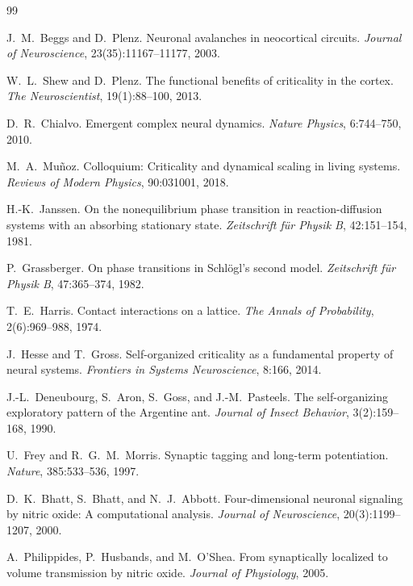 \documentclass[11pt,a4paper]{article}
\begin{document}

\begin{thebibliography}{99}


J.~M.~Beggs and D.~Plenz.
Neuronal avalanches in neocortical circuits.
\emph{Journal of Neuroscience}, 23(35):11167--11177, 2003.

W.~L.~Shew and D.~Plenz.
The functional benefits of criticality in the cortex.
\emph{The Neuroscientist}, 19(1):88--100, 2013.

D.~R.~Chialvo.
Emergent complex neural dynamics.
\emph{Nature Physics}, 6:744--750, 2010.

M.~A.~Mu\~{n}oz.
Colloquium: Criticality and dynamical scaling in living systems.
\emph{Reviews of Modern Physics}, 90:031001, 2018.

H.-K.~Janssen.
On the nonequilibrium phase transition in reaction-diffusion systems
with an absorbing stationary state.
\emph{Zeitschrift f\"{u}r Physik B}, 42:151--154, 1981.

P.~Grassberger.
On phase transitions in Schl\"{o}gl's second model.
\emph{Zeitschrift f\"{u}r Physik B}, 47:365--374, 1982.

T.~E.~Harris.
Contact interactions on a lattice.
\emph{The Annals of Probability}, 2(6):969--988, 1974.

J.~Hesse and T.~Gross.
Self-organized criticality as a fundamental property of neural systems.
\emph{Frontiers in Systems Neuroscience}, 8:166, 2014.


J.-L.~Deneubourg, S.~Aron, S.~Goss, and J.-M.~Pasteels.
The self-organizing exploratory pattern of the Argentine ant.
\emph{Journal of Insect Behavior}, 3(2):159--168, 1990.


U.~Frey and R.~G.~M.~Morris.
Synaptic tagging and long-term potentiation.
\emph{Nature}, 385:533--536, 1997.

D.~K.~Bhatt, S.~Bhatt, and N.~J.~Abbott.
Four-dimensional neuronal signaling by nitric oxide: A computational
analysis.
\emph{Journal of Neuroscience}, 20(3):1199--1207, 2000.

A.~Philippides, P.~Husbands, and M.~O'Shea.
From synaptically localized to volume transmission by nitric oxide.
\emph{Journal of Physiology}, 2005.


\end{thebibliography}
\end{document}
